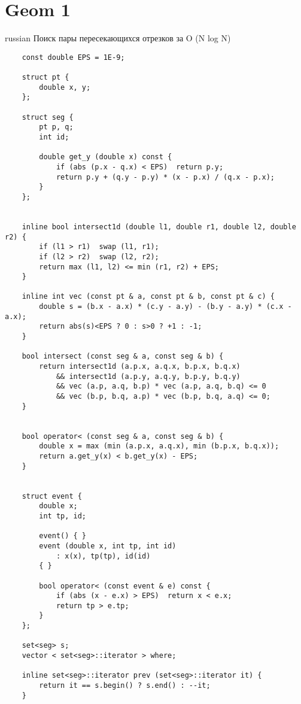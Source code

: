 \documentclass{article}
\begin{document}
\section{Geom 1}
\begin{otherlanguage*}{russian}
    Поиск пары пересекающихся отрезков за O (N log N)
\end{otherlanguage*}
\begin{verbatim}
    const double EPS = 1E-9;
     
    struct pt {
        double x, y;
    };
     
    struct seg {
        pt p, q;
        int id;
     
        double get_y (double x) const {
            if (abs (p.x - q.x) < EPS)  return p.y;
            return p.y + (q.y - p.y) * (x - p.x) / (q.x - p.x);
        }
    };
     
     
    inline bool intersect1d (double l1, double r1, double l2, double r2) {
        if (l1 > r1)  swap (l1, r1);
        if (l2 > r2)  swap (l2, r2);
        return max (l1, l2) <= min (r1, r2) + EPS;
    }
     
    inline int vec (const pt & a, const pt & b, const pt & c) {
        double s = (b.x - a.x) * (c.y - a.y) - (b.y - a.y) * (c.x - a.x);
        return abs(s)<EPS ? 0 : s>0 ? +1 : -1;
    }
     
    bool intersect (const seg & a, const seg & b) {
        return intersect1d (a.p.x, a.q.x, b.p.x, b.q.x)
            && intersect1d (a.p.y, a.q.y, b.p.y, b.q.y)
            && vec (a.p, a.q, b.p) * vec (a.p, a.q, b.q) <= 0
            && vec (b.p, b.q, a.p) * vec (b.p, b.q, a.q) <= 0;
    }
     
     
    bool operator< (const seg & a, const seg & b) {
        double x = max (min (a.p.x, a.q.x), min (b.p.x, b.q.x));
        return a.get_y(x) < b.get_y(x) - EPS;
    }
     
     
    struct event {
        double x;
        int tp, id;
     
        event() { }
        event (double x, int tp, int id)
            : x(x), tp(tp), id(id)
        { }
     
        bool operator< (const event & e) const {
            if (abs (x - e.x) > EPS)  return x < e.x;
            return tp > e.tp;
        }
    };
     
    set<seg> s;
    vector < set<seg>::iterator > where;
     
    inline set<seg>::iterator prev (set<seg>::iterator it) {
        return it == s.begin() ? s.end() : --it;
    }
     

\end{verbatim}
\end{document}
